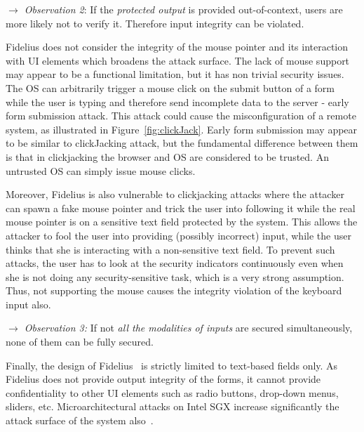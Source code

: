 \noindent\emph{$\rightarrow$ Observation 2}: If the \emph{protected output} is provided out-of-context, users are more likely not to verify it. Therefore input integrity can be violated.


Fidelius does not consider the integrity of the mouse pointer and its interaction with UI elements which broadens the attack surface. The lack of mouse support may appear to be a functional limitation, but it has non trivial security issues.
The OS can arbitrarily trigger a mouse click on the submit button of a form while the user is typing and therefore send incomplete data to the server - early form submission attack.
This attack could cause the misconfiguration of a remote system, as illustrated in Figure~\ref{fig:clickJack}. Early form submission may appear to be similar to clickJacking attack, but the fundamental difference between them is that in clickjacking the browser and OS are considered to be trusted. An untrusted OS can simply issue mouse clicks.

Moreover, Fidelius is also vulnerable to clickjacking attacks where the attacker can spawn a fake mouse pointer and trick the user into following it while the real mouse pointer is on a sensitive text field protected by the system. This allows the attacker to fool the user into providing (possibly incorrect) input, while the user thinks that she is interacting with a non-sensitive text field. To prevent such attacks, the user has to look at the security indicators continuously even when she is not doing any security-sensitive task, which is a very strong assumption. 
Thus, not supporting the mouse causes the integrity violation of the keyboard input also.

\noindent\emph{$\rightarrow$ Observation 3:} If not \emph{all the modalities of inputs} are secured simultaneously, none of them can be fully secured.


Finally, the design of Fidelius~\cite{Fidelius} is strictly limited to text-based fields only. As Fidelius does not provide output integrity of the forms, it cannot provide confidentiality to other UI elements such as radio buttons, drop-down menus, sliders, etc.
Microarchitectural attacks on Intel SGX increase significantly the attack surface of the system also~\cite{van2018foreshadow}.

     


